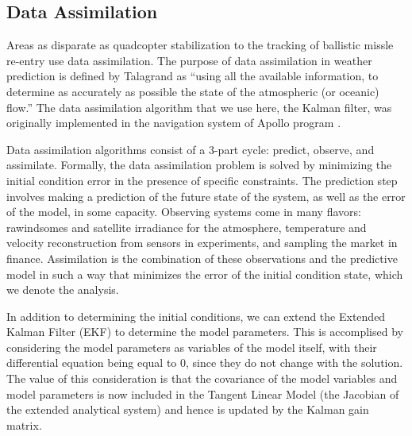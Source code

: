 \documentclass[onecolumn]{article}
\begin{document}
\begin{multicols}{2}
\subsection{Data Assimilation}

Areas as disparate as quadcopter stabilization \cite{achtelik2009visual} to the tracking of ballistic missle re-entry \cite{siouris1997tracking} use data assimilation.
The purpose of data assimilation in weather prediction is defined by Talagrand as ``using all the available information, to determine as accurately as possible the state of the atmospheric (or oceanic) flow.'' \cite{talagrand1997assimilation}
The data assimilation algorithm that we use here, the Kalman filter, was originally implemented in the navigation system of Apollo program \cite{kalman1961new,savely1972}.

Data assimilation algorithms consist of a 3-part cycle: predict, observe, and assimilate.
Formally, the data assimilation problem is solved by minimizing the initial condition error in the presence of specific constraints.
The prediction step involves making a prediction of the future state of the system, as well as the error of the model, in some capacity.
Observing systems come in many flavors: rawindsomes and satellite irradiance for the atmosphere, temperature and velocity reconstruction from sensors in experiments, and sampling the market in finance.
Assimilation is the combination of these observations and the predictive model in such a way that minimizes the error of the initial condition state, which we denote the analysis.

In addition to determining the initial conditions, we can extend the Extended Kalman Filter (EKF) to determine the model parameters.
This is accomplised by considering the model parameters as variables of the model itself, with their differential equation being equal to 0, since they do not change with the solution.
The value of this consideration is that the covariance of the model variables and model parameters is now included in the Tangent Linear Model (the Jacobian of the extended analytical system) and hence is updated by the Kalman gain matrix.


\end{multicols}
\end{document}
